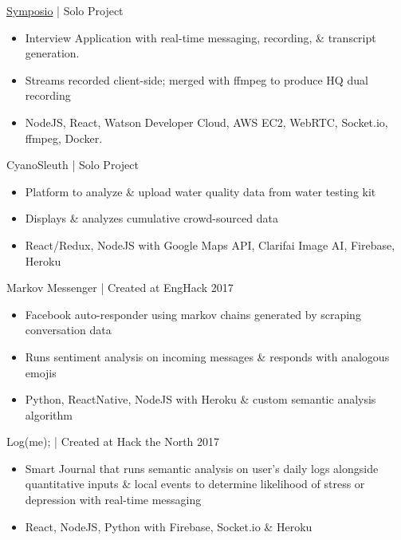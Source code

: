 \documentclass[]{friggeri-cv}
\begin{document}
\begin{entrylist}
	\entry
	{\href{https://symposio.stream}{Symposio\textsuperscript{\faExternalLink}} | \href{https://github.com/suzyng83209/symposio}{\faGithub}}
	{\vspace{0.5\parsep}Solo Project}
	{
		\begin{itemize}[leftmargin=*]\itemsep0.1cm
			\vspace{-0.4cm}
			\item Interview Application with real-time messaging, recording, \& transcript generation.
			\item Streams recorded client-side; merged with ffmpeg to produce HQ dual recording
			\item NodeJS, React, Watson Developer Cloud, AWS EC2, WebRTC, Socket.io, ffmpeg, Docker. 
		\end{itemize}
	}
	\entry
	{CyanoSleuth | \href{https://github.com/suzyng83209/cyanosleuth}{\faGithub}}
	{\vspace{0.5\parsep}Solo Project}
	{
		\begin{itemize}[leftmargin=*]\itemsep0.1cm
			\vspace{-0.4cm}
			\item Platform to analyze \& upload water quality data from water testing kit
			\item Displays \& analyzes cumulative crowd-sourced data
			\item React/Redux, NodeJS with Google Maps API, Clarifai Image AI, Firebase, Heroku
		\end{itemize}
	}
	\entry
	{Markov Messenger | \href{https://github.com/suzyng83209/markov-messenger-bot}{\faGithub}}
	{\vspace{0.5\parsep}Created at EngHack 2017}
	{
		\begin{itemize}[leftmargin=*]\itemsep0.1cm
			\vspace{-0.4cm}
			\item Facebook auto-responder using markov chains generated by scraping conversation data
			\item Runs sentiment analysis on incoming messages \& responds with analogous emojis
			\item Python, ReactNative, NodeJS with Heroku \& custom semantic analysis algorithm
		\end{itemize}
	}
	\entry
	{Log(me); | \href{https://github.com/suzyng83209/htn2017}{\faGithub}}
	{\vspace{0.5\parsep}Created at Hack the North 2017}
	{
		\begin{itemize}[leftmargin=*]\itemsep0.1cm
			\vspace{-0.4cm}
			\item Smart Journal that runs semantic analysis on user's daily logs alongside quantitative inputs \& local events to determine likelihood of stress or depression with real-time messaging
			\item React, NodeJS, Python with Firebase, Socket.io \& Heroku
		\end{itemize}
	}
\end{entrylist}
\end{document}
